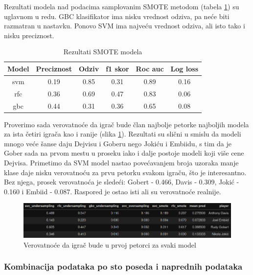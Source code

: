 \documentclass[a4paper]{article}
\begin{document}
Rezultati modela nad podacima samplovanim SMOTE metodom (tabela \ref{tab:smote_pg_simple}) su uglavnom u redu. GBC klasifikator ima nisku vrednost odziva, pa neće biti razmatran u nastavku. Ponovo SVM ima najveću vrednost odziva, ali isto tako i nisku preciznost.

\begin{table}[!h]
\begin{center}
\begin{tabular}{|c|c|c|c|c|c|} \hline
\textbf{Model} & \textbf{Preciznost} & \textbf{Odziv} & \textbf{f1 skor} & \textbf{Roc auc} & \textbf{Log loss} \\ \hline
svm & 0.19 & 0.85 & 0.31 & 0.89 & 0.16 \\ \hline
rfc & 0.36 & 0.69 & 0.47 & 0.83 & 0.06 \\ \hline
gbc & 0.44 & 0.31 & 0.36 & 0.65 & 0.08 \\ \hline
\end{tabular}
\caption{Rezultati SMOTE modela}
\label{tab:smote_pg_simple}
\end{center}
\end{table}

Proverimo sada verovatnoće da igrač bude član najbolje petorke najboljih modela za ista četiri igrača kao i ranije (slika \ref{plt:clf_pg_simpler}). Rezultati su slični u smislu da modeli mnogo veće šanse daju Dejvisu i Goberu nego Jokiću i Embiidu, s tim da je Gober sada na prvom mestu u proseku iako i dalje postoje modeli koji više cene Dejvisa. Primetimo da SVM model nastao povećavanjem broja uzoraka manje klase daje nisku verovatnoću za prvu petorku svakom igraču, što je interesantno. Bez njega, prosek verovatnoća je sledeći: Gobert - 0.466, Davis - 0.309, Jokić - 0.160 i Embiid - 0.087. Raspored je ostao isti ali su verovatnoće realnije.

\begin{figure}[h!]
\begin{center}
\includegraphics[scale=0.50]{clf_pg_simpler.png}
\end{center}
\caption{Verovatnoće da igrač bude u prvoj petorci za svaki model}
\label{plt:clf_pg_simpler}
\end{figure}

\subsubsection{Kombinacija podataka po sto poseda i naprednih podataka}
\label{subsubsec:kombo_pp_adv_simple}
\end{document}
